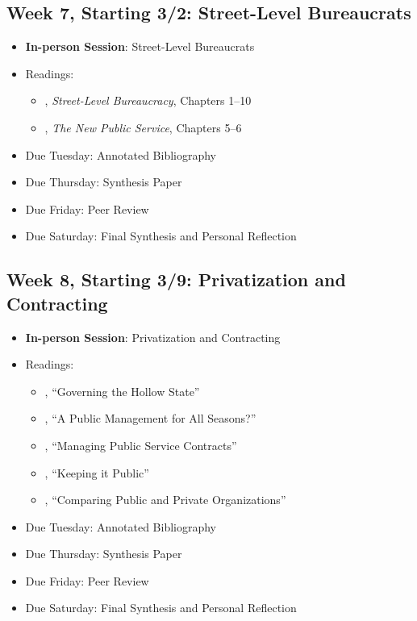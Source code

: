 \documentclass[11pt, letterpaper]{article}
\begin{document}
\subsection*{Week 7, Starting 3/2: Street-Level Bureaucrats}
\begin{itemize}
    \item \textbf{In-person Session}: Street-Level Bureaucrats
    \item Readings:
        \begin{itemize}
            \item \citet{Lipsky2010}, \emph{Street-Level Bureaucracy}, Chapters 1--10 
            \item \citet{Denhardt2015}, \emph{The New Public Service}, Chapters 5--6 
        \end{itemize}
    \item Due Tuesday: Annotated Bibliography
    \item Due Thursday: Synthesis Paper
    \item Due Friday: Peer Review
    \item Due Saturday: Final Synthesis and Personal Reflection
\end{itemize}

\subsection*{Week 8, Starting 3/9: Privatization and Contracting}
\begin{itemize}
    \item \textbf{In-person Session}: Privatization and Contracting
    \item Readings:
        \begin{itemize}
            \item \citet{MILWARD2000a}, ``Governing the Hollow State''
            \item \cite{hood1991}, ``A Public Management for All Seasons?''
            \item \citet{brownManagingPublicService2006}, ``Managing Public Service Contracts''
            \item \citet{jos2009}, ``Keeping it Public''
            \item \citet{raineyComparingPublicPrivate2000}, ``Comparing Public and Private Organizations''
        \end{itemize}
    \item Due Tuesday: Annotated Bibliography
    \item Due Thursday: Synthesis Paper
    \item Due Friday: Peer Review
    \item Due Saturday: Final Synthesis and Personal Reflection
\end{itemize}
\end{document}
